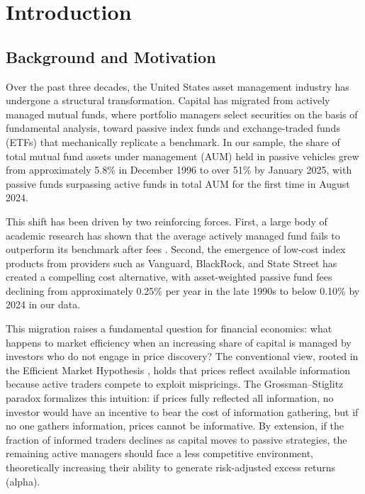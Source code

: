 \documentclass[11pt, a4paper]{article}
\begin{document}
\section{Introduction}
\label{sec:introduction}

\subsection{Background and Motivation}

Over the past three decades, the United States asset management industry has undergone a structural transformation. Capital has migrated from actively managed mutual funds, where portfolio managers select securities on the basis of fundamental analysis, toward passive index funds and exchange-traded funds (ETFs) that mechanically replicate a benchmark. In our sample, the share of total mutual fund assets under management (AUM) held in passive vehicles grew from approximately 5.8\% in December 1996 to over 51\% by January 2025, with passive funds surpassing active funds in total AUM for the first time in August 2024.

This shift has been driven by two reinforcing forces. First, a large body of academic research has shown that the average actively managed fund fails to outperform its benchmark after fees \parencite{fama2010, carhart1997, barras2010}. Second, the emergence of low-cost index products from providers such as Vanguard, BlackRock, and State Street has created a compelling cost alternative, with asset-weighted passive fund fees declining from approximately 0.25\% per year in the late 1990s to below 0.10\% by 2024 in our data.

This migration raises a fundamental question for financial economics: what happens to market efficiency when an increasing share of capital is managed by investors who do not engage in price discovery? The conventional view, rooted in the Efficient Market Hypothesis \parencite{fama1970}, holds that prices reflect available information because active traders compete to exploit mispricings. The Grossman--Stiglitz paradox \parencite{grossman1980} formalizes this intuition: if prices fully reflected all information, no investor would have an incentive to bear the cost of information gathering, but if no one gathers information, prices cannot be informative. By extension, if the fraction of informed traders declines as capital moves to passive strategies, the remaining active managers should face a less competitive environment, theoretically increasing their ability to generate risk-adjusted excess returns (alpha).
\end{document}
